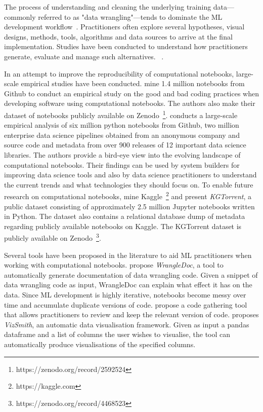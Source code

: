\documentclass[acmsmall,screen,review,anonymous]{acmart}
\begin{document}
The process of understanding and cleaning the underlying training data---commonly referred to as "data wrangling"---tends to dominate the ML development workflow~\cite{CITME}. Practitioners often explore several hypotheses, visual designs, methods, tools, algorithms and data sources to arrive at the final implementation. Studies have been conducted to understand how practitioners generate, evaluate and manage such alternatives. ~\cite{liu2019understanding,kandel2012enterprise}.

In an attempt to improve the reproducibility of computational notebooks, large-scale empirical studies have been conducted. \citeauthor{pimentel2019large} mine 1.4 million notebooks from Github to conduct an empirical study on the good and bad coding practices when developing software using computational notebooks. The authors also make their dataset of notebooks publicly available on Zenodo~\footnote{https://zenodo.org/record/2592524}. 
\citeauthor{psallidas2019data} conducts a large-scale empirical analysis of six million python notebooks from Github, two million enterprise data science pipelines obtained from an anonymous company and source code and metadata from over 900 releases of 12 important data science libraries. The authors provide a bird-eye view into the evolving landscape of computational notebooks. Their findings can be used by system builders for improving data science tools and also by data science practitioners to understand the current trends and what technologies they should focus on. To enable future research on computational notebooks, \citeauthor{quaranta2021kgtorrent} mine Kaggle~\footnote{https://kaggle.com} and present \textit{KGTorrent}, a public dataset consisting of approximately 2.5 million Jupyter notebooks written in Python. The dataset also contains a relational database dump of metadata regarding publicly available notebooks on Kaggle. The KGTorrent dataset is publicly available on Zenodo~\footnote{https://zenodo.org/record/4468523}.

Several tools have been proposed in the literature to aid ML practitioners when working with computational notebooks. \citeauthor{yang2021subtle} propose \textit{WrangleDoc}, a tool to automatically generate documentation of data wrangling code. Given a snippet of data wrangling code as input, WrangleDoc can explain what effect it has on the data. Since ML development is highly iterative, notebooks become messy over time and accumulate duplicate versions of code. \citeauthor{head2019managing} propose a code gathering tool that allows practitioners to review and keep the relevant version of code. \citeauthor{bavishi2021vizsmith} proposes \textit{VizSmith}, an automatic data visualisation framework. Given as input a pandas dataframe and a list of columns the user wishes to visualise, the tool can automatically produce visualisations of the specified columns.
\end{document}

